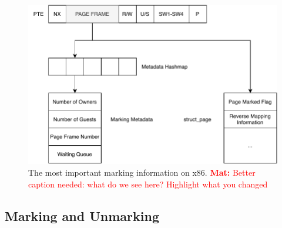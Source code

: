 \documentclass[conference]{IEEEtran}
\newcommand{\mat}[1]{\textcolor{red}{\textbf{Mat:} #1}}
\begin{document}
\begin{figure}[]
  \centering
  \includegraphics[width=\linewidth]{img/book-keeping.pdf}
  \caption{The most important marking information on x86. 
\mat{Better caption needed: what do we see here? Highlight what you changed}
}
  \label{fig:bookkeeping}
\end{figure}

\subsection{Marking and Unmarking}
\end{document}
